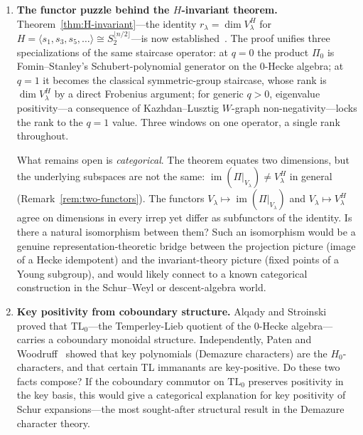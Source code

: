 \begin{enumerate}[label=\textbf{Q\arabic*.}, ref=Q\arabic*, leftmargin=3em]
\item \label{q:rank-formula} \label{q:H-invariant}
\textbf{The functor puzzle behind the $H$-invariant theorem.}
Theorem~\ref{thm:H-invariant}---the identity
$r_\lambda = \dim V_\lambda^H$ for $H = \langle s_1, s_3, s_5,
\ldots \rangle \cong S_2^{\lfloor n/2 \rfloor}$---is now
established~\cite{clio-h-invariant-2026}.  The proof unifies three
specializations of the same staircase operator: at $q = 0$ the product
$\Pi_0$ is Fomin--Stanley's Schubert-polynomial generator on the
$0$-Hecke algebra; at $q = 1$ it becomes the classical symmetric-group
staircase, whose rank is $\dim V_\lambda^H$ by a direct Frobenius
argument; for generic $q > 0$, eigenvalue positivity---a consequence
of Kazhdan--Lusztig $W$-graph non-negativity---locks the rank to the
$q = 1$ value.  Three windows on one operator, a single rank throughout.
\par
What remains open is \emph{categorical}.  The theorem equates two
dimensions, but the underlying subspaces are not the same:
$\operatorname{im}(\Pi|_{V_\lambda}) \neq V_\lambda^H$ in general
(Remark~\ref{rem:two-functors}).  The functors
$V_\lambda \mapsto \operatorname{im}(\Pi|_{V_\lambda})$ and
$V_\lambda \mapsto V_\lambda^H$ agree on dimensions in every irrep
yet differ as subfunctors of the identity.  Is there a natural
isomorphism between them?  Such an isomorphism would be a genuine
representation-theoretic bridge between the projection picture
(image of a Hecke idempotent) and the invariant-theory picture
(fixed points of a Young subgroup), and would likely connect to a
known categorical construction in the Schur--Weyl or descent-algebra
world.

\item \label{q:tl-key}
\textbf{Key positivity from coboundary structure.}
Alqady and Stroinski~\cite{alqady-stroinski-2025} proved that
$\mathrm{TL}_0$---the Temperley-Lieb quotient of the $0$-Hecke
algebra---carries a coboundary monoidal structure.  Independently,
Paten and Woodruff~\cite{paten-woodruff-2025} showed that
key polynomials (Demazure characters) are the
$H_0$-characters, and that certain TL immanants
are key-positive.  Do these two facts compose?  If the coboundary
commutor on $\mathrm{TL}_0$ preserves positivity in the key basis,
this would give a categorical explanation for key positivity of
Schur expansions---the most sought-after structural result in the
Demazure character theory.

\end{enumerate}


